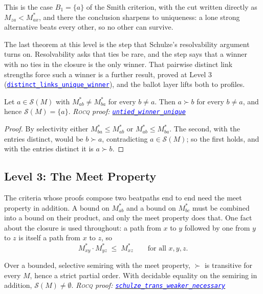 \documentclass[a4paper,UKenglish,cleveref,autoref,thm-restate,anonymous]{lipics-v2021}
\newcommand{\Mstar}{M^{\ast}}
\newcommand{\rocq}{\textsc{Rocq}}
\newcommand{\anonrepo}{https://anonymous.4open.science/r/Semiring_graph_algorithm-000E}
\newcommand{\rocqfile}[2]{\href{\anonrepo/#1}{\textcolor{blue}{\texttt{#2}}}}
\newcommand{\proofat}[2]{{\footnotesize\itshape\rocq{} proof: \rocqfile{#1}{#2}}}
\begin{document}
This is the case $B_1 = \{a\}$ of the Smith criterion, with the cut written
directly as $M_{za} < \Mstar_{ax}$, and there the conclusion sharpens to
uniqueness: a lone strong alternative beats every other, so no other can
survive.

The last theorem at this level is the step that Schulze's resolvability
argument turns on. Resolvability asks that ties be rare, and the step says
that a winner with no ties in the closure is the only winner. That
pairwise distinct link strengths force such a winner is a further result,
proved at Level 3
(\rocqfile{algorithm/CriticalLinkN.v}{distinct\_links\_unique\_winner}),
and the ballot layer lifts both to profiles.

\begin{theorem}\label{thm:resolution}
Let $a \in \mathcal{S}(M)$ with $\Mstar_{ab} \neq \Mstar_{ba}$ for every
$b \neq a$. Then $a \succ b$ for every $b \neq a$, and hence
$\mathcal{S}(M) = \{a\}$.
\proofat{algorithm/ResolvabilityN.v}{untied\_winner\_unique}
\end{theorem}

\begin{proof}
By selectivity either $\Mstar_{ba} \leq \Mstar_{ab}$ or
$\Mstar_{ab} \leq \Mstar_{ba}$. The second, with the entries distinct,
would be $b \succ a$, contradicting $a \in \mathcal{S}(M)$; so the first
holds, and with the entries distinct it is $a \succ b$.
\end{proof}

\subsection{Level 3: The Meet Property}
The criteria whose proofs compose two beatpaths end to end need the meet
property in addition. A bound on $\Mstar_{ab}$ and a bound on $\Mstar_{bc}$
must be combined into a bound on their product, and only the meet property
does that. One fact about the closure is used throughout: a path from $x$
to $y$ followed by one from $y$ to $z$ is itself a path from $x$ to $z$, so
\[
  \Mstar_{xy}\cdot\Mstar_{yz} \;\leq\; \Mstar_{xz}
  \qquad \text{for all } x,y,z.
\]

\begin{theorem}[Transitivity]\label{thm:trans}
Over a bounded, selective semiring with the meet property, $\succ$ is
transitive for every $M$, hence a strict partial order. With decidable
equality on the semiring in addition, $\mathcal{S}(M) \neq \emptyset$.
\proofat{algorithm/TransitivityN.v}{schulze\_trans\_weaker\_necessary}
\end{theorem}
\end{document}

